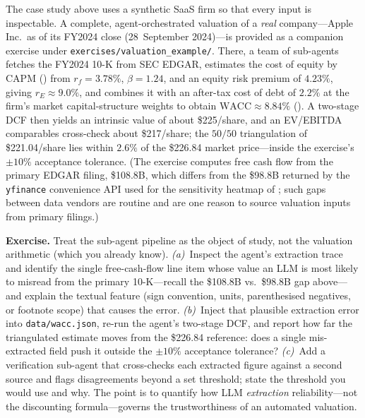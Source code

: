 \begin{remark}
\label{rem:valuation-companion}
The case study above uses a synthetic SaaS firm so that every input is inspectable.
A complete, agent-orchestrated valuation of a \emph{real} company---Apple Inc.\ as of
its FY2024 close (28~September 2024)---is provided as a companion exercise under
\texttt{exercises/valuation\_example/}. There, a team of sub-agents fetches the FY2024
10-K from SEC EDGAR, estimates the cost of equity by CAPM () from
$r_f = 3.78\%$, $\beta = 1.24$, and an equity risk premium of $4.23\%$, giving
$r_E \approx 9.0\%$, and combines it with an after-tax cost of debt of $2.2\%$ at the
firm's market capital-structure weights to obtain $\mathrm{WACC} \approx 8.84\%$
(). A two-stage DCF then yields an intrinsic value of about
\$225/share, and an EV/EBITDA comparables cross-check about \$217/share; the
$50/50$ triangulation of \$221.04/share lies within $2.6\%$ of the \$226.84 market
price---inside the exercise's $\pm 10\%$ acceptance tolerance. (The exercise computes
free cash flow from the primary EDGAR filing, \$108.8B, which differs from the \$98.8B
returned by the \texttt{yfinance} convenience API used for the sensitivity heatmap of
; such gaps between data vendors are routine and are one
reason to source valuation inputs from primary filings.)

\textbf{Exercise.} Treat the sub-agent pipeline as the object of study, not the
valuation arithmetic (which you already know). \emph{(a)}~Inspect the agent's
extraction trace and identify the single free-cash-flow line item whose value an
LLM is most likely to misread from the primary 10-K---recall the \$108.8B vs.\
\$98.8B gap above---and explain the textual feature (sign convention, units,
parenthesised negatives, or footnote scope) that causes the error. \emph{(b)}~Inject
that plausible extraction error into \texttt{data/wacc.json}, re-run the agent's
two-stage DCF, and report how far the triangulated estimate moves from the \$226.84
reference: does a single mis-extracted field push it outside the $\pm 10\%$ acceptance
tolerance? \emph{(c)}~Add a verification sub-agent that cross-checks each extracted
figure against a second source and flags disagreements beyond a set threshold; state
the threshold you would use and why. The point is to quantify how LLM \emph{extraction}
reliability---not the discounting formula---governs the trustworthiness of an
automated valuation.
\end{remark}

